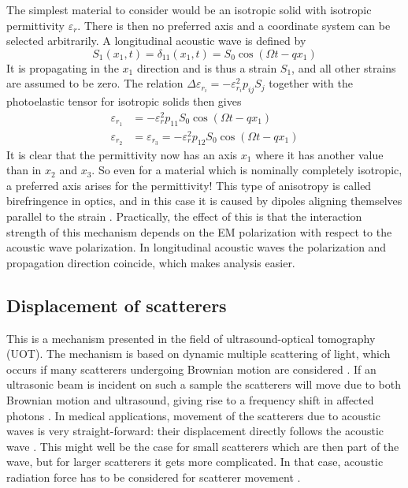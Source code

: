 \documentclass[10pt,a4paper,twocolumn,draft]{scrartcl}
\begin{document}
	The simplest material to consider would be an isotropic solid with isotropic permittivity $\varepsilon_r$. There is then no preferred axis and a coordinate system can be selected arbitrarily. A longitudinal acoustic wave is defined by \begin{equation*}
	S_1(x_1,t) = \delta_{11}(x_1,t) = S_0 \cos(\Omega t - qx_1)
	\end{equation*}
	It is propagating in the $x_1$ direction and is thus a strain $S_1$, and all other strains are assumed to be zero. The relation $\Delta \varepsilon_{r_i} = -\varepsilon_{r_i}^2 p_{ij} S_j$ together with the photoelastic tensor for isotropic solids then gives
	\begin{align*}
		\varepsilon_{r_1} &= -\varepsilon_r^2 p_{11} S_0 \cos(\Omega t - qx_1) \\
		\varepsilon_{r_2} &= \varepsilon_{r_3} = -\varepsilon_r^2 p_{12} S_0 \cos(\Omega t - qx_1)
	\end{align*}
	It is clear that the permittivity now has an axis $x_1$ where it has another value than in $x_2$ and $x_3$. So even for a material which is nominally completely isotropic, a preferred axis arises for the permittivity! This type of anisotropy is called birefringence in optics, and in this case it is caused by dipoles aligning themselves parallel to the strain \cite{Korpel1988}. Practically, the effect of this is that the interaction strength of this mechanism depends on the EM polarization with respect to the acoustic wave polarization. In longitudinal acoustic waves the polarization and propagation direction coincide, which makes analysis easier.
	
	
	\subsection{Displacement of scatterers}
	This is a mechanism presented in the field of ultrasound-optical tomography (UOT). The mechanism is based on dynamic multiple scattering of light, which occurs if many scatterers undergoing Brownian motion are considered \cite{Leutz1995}. If an ultrasonic beam is incident on such a sample the scatterers will move due to both Brownian motion and ultrasound, giving rise to a frequency shift in affected photons \cite{Leutz1995}\cite{Elson2011}. In medical applications, movement of the scatterers due to acoustic waves is very straight-forward: their displacement directly follows the acoustic wave \cite{Leutz1995}. This might well be the case for small scatterers which are then part of the wave, but for larger scatterers it gets more complicated. In that case, acoustic radiation force has to be considered for scatterer movement \cite{Torr1984}.
	
\end{document}
